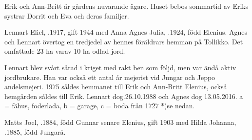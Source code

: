 
Erik och Ann-Britt är gårdens nuvarande ägare. Huset bebos sommartid av Eriks systrar Dorrit och Eva och deras familjer.\jhvspace{}



Lennart Eliel, .1917, gift 1944 med Anna Agnes Julia, .1924, född Elenius. Agnes och Lennart övertog en tredjedel av hennes föräldrars hemman på Tollikko. Det omfattade 23 ha varav 10 ha odlad jord.
\begin{jhchildren}
  \item {}
  \item {}
  \item {}
\end{jhchildren}

 Lennart blev svårt sårad i kriget med rakt ben som följd, men var ändå aktiv jordbrukare. Han var också ett antal år mejerist vid Jungar och Jeppo andelsmejeri. 1975 såldes hemmanet till Erik och Ann-Britt Elenius, också hemgården såldes till Erik. Lennart dog.26.10.1988 och Agnes dog 13.05.2016. a = fähus, foderlada, b = garage, c = boda från 1727 *)se nedan.


Matts Joel, .1884, född Gunnar senare Elenius, gift 1903 med Hilda Johanna, .1885, född Jungarå.
\begin{jhchildren}
  \item {}
  \item {}
  \item {}
  \item {}
  \item {}
\end{jhchildren}


